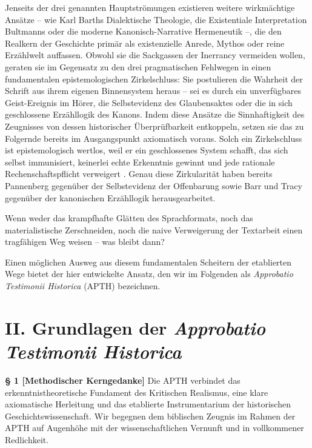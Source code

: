 \documentclass[11pt,a4paper]{article}
\makeatletter
\newcommand{\apth}{{\apthfont APTH}\hspace{0.15em}\xspace}
\newcommand{\apthsec}[3]{%
  \phantomsection%
  \def\@currentlabel{#1}%
  \label{sec:#3}%
  \textbf{§ #1 [#2]}%
}
\makeatother
\begin{document}
Jenseits der drei genannten Hauptströmungen existieren weitere wirkmächtige Ansätze – wie Karl Barths Dialektische Theologie, die Existentiale Interpretation Bultmanns oder die moderne Kanonisch-Narrative Hermeneutik \citep{barth1922,bultmann1941,childs1979,frei1974} –, die den Realkern der Geschichte primär als existenzielle Anrede, Mythos oder reine Erzählwelt auffassen. Obwohl sie die Sackgassen der Inerrancy vermeiden wollen, geraten sie im Gegensatz zu den drei pragmatischen Fehlwegen in einen fundamentalen epistemologischen Zirkelschluss: Sie postulieren die Wahrheit der Schrift aus ihrem eigenen Binnensystem heraus – sei es durch ein unverfügbares Geist-Ereignis im Hörer, die Selbstevidenz des Glaubensaktes oder die in sich geschlossene Erzähllogik des Kanons. Indem diese Ansätze die Sinnhaftigkeit des Zeugnisses von dessen historischer Überprüfbarkeit entkoppeln, setzen sie das zu Folgernde bereits im Ausgangspunkt axiomatisch voraus. Solch ein Zirkelschluss ist epistemologisch wertlos, weil er ein geschlossenes System schafft, das sich selbst immunisiert, keinerlei echte Erkenntnis gewinnt und jede rationale Rechenschaftspflicht verweigert \citep{popper1963}. Genau diese Zirkularität haben bereits Pannenberg \citeyearpar{pannenberg1961,pannenberg1973} gegenüber der Selbstevidenz der Offenbarung sowie Barr \citeyearpar{barr1983} und Tracy \citeyearpar{tracy1981} gegenüber der kanonischen Erzähllogik herausgearbeitet.

Wenn weder das krampfhafte Glätten des Sprachformats, noch das materialistische Zerschneiden, noch die naive Verweigerung der Textarbeit einen tragfähigen Weg weisen – was bleibt dann?

Einen möglichen Ausweg aus diesem fundamentalen Scheitern der etablierten Wege bietet der hier entwickelte Ansatz, den wir im Folgenden als \textit{Approbatio Testimonii Historica} (\apth) bezeichnen. 

\section*{II. Grundlagen der \textit{Approbatio Testimonii Historica}}

\apthsec{1}{Methodischer Kerngedanke}{kerngedanke} Die \apth verbindet das erkenntnistheoretische Fundament des Kritischen Realismus, eine klare axiomatische Herleitung und das etablierte Instrumentarium der historischen Geschichtswissenschaft. Wir begegnen dem biblischen Zeugnis im Rahmen der \apth auf Augenhöhe mit der wissenschaftlichen Vernunft und in vollkommener Redlichkeit.
\end{document}
